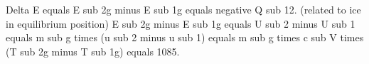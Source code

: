 Delta E equals E sub 2g minus E sub 1g equals negative Q sub 12.  
(related to ice in equilibrium position)  
E sub 2g minus E sub 1g equals U sub 2 minus U sub 1 equals m sub g times (u sub 2 minus u sub 1) equals m sub g times c sub V times (T sub 2g minus T sub 1g) equals 1085.
